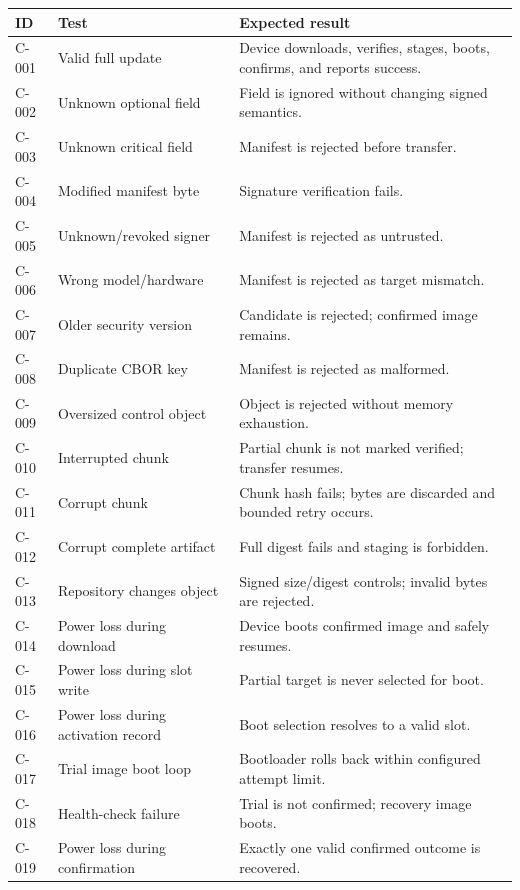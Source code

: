 \begin{longtable}{@{}L{18mm}L{52mm}L{82mm}@{}}
  \toprule
  \textbf{ID} & \textbf{Test} & \textbf{Expected result} \\
  \midrule
  \endhead
  C-001 & Valid full update & Device downloads, verifies, stages, boots, confirms,
    and reports success. \\
  C-002 & Unknown optional field & Field is ignored without changing signed semantics. \\
  C-003 & Unknown critical field & Manifest is rejected before transfer. \\
  C-004 & Modified manifest byte & Signature verification fails. \\
  C-005 & Unknown/revoked signer & Manifest is rejected as untrusted. \\
  C-006 & Wrong model/hardware & Manifest is rejected as target mismatch. \\
  C-007 & Older security version & Candidate is rejected; confirmed image remains. \\
  C-008 & Duplicate CBOR key & Manifest is rejected as malformed. \\
  C-009 & Oversized control object & Object is rejected without memory exhaustion. \\
  C-010 & Interrupted chunk & Partial chunk is not marked verified; transfer resumes. \\
  C-011 & Corrupt chunk & Chunk hash fails; bytes are discarded and bounded retry occurs. \\
  C-012 & Corrupt complete artifact & Full digest fails and staging is forbidden. \\
  C-013 & Repository changes object & Signed size/digest controls; invalid bytes are rejected. \\
  C-014 & Power loss during download & Device boots confirmed image and safely resumes. \\
  C-015 & Power loss during slot write & Partial target is never selected for boot. \\
  C-016 & Power loss during activation record & Boot selection resolves to a valid slot. \\
  C-017 & Trial image boot loop & Bootloader rolls back within configured attempt limit. \\
  C-018 & Health-check failure & Trial is not confirmed; recovery image boots. \\
  C-019 & Power loss during confirmation & Exactly one valid confirmed outcome is recovered. \\

\end{longtable}
